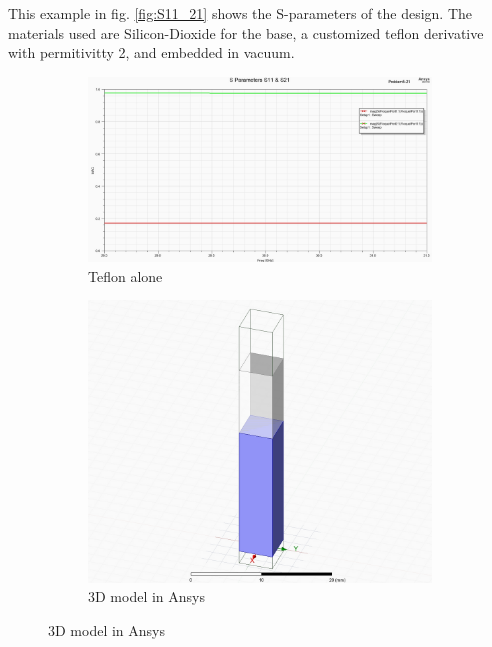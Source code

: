 \documentclass[12pt]{article}
\begin{document}
This example in fig. \ref{fig:S11_21} shows the S-parameters of the design. The materials used are Silicon-Dioxide for the base, a customized teflon derivative with permitivitty 2, and embedded in vacuum.



\begin{figure}[ht]
\centering
\begin{subfigure}[b]{0.45\textwidth}
  \centering
  \includegraphics[width=\textwidth]{./images/S11_21_teflon_alone.png}
  \caption{Teflon alone}
  \label{fig:teflon}
\end{subfigure}
\hfill %
\begin{subfigure}[b]{0.45\textwidth}
  \centering
  \includegraphics[width=\textwidth]{./images/Go1_5-9_model.png}
  \caption{3D model in Ansys}
  \label{fig:model}
\end{subfigure}


\end{figure}
\end{document}
